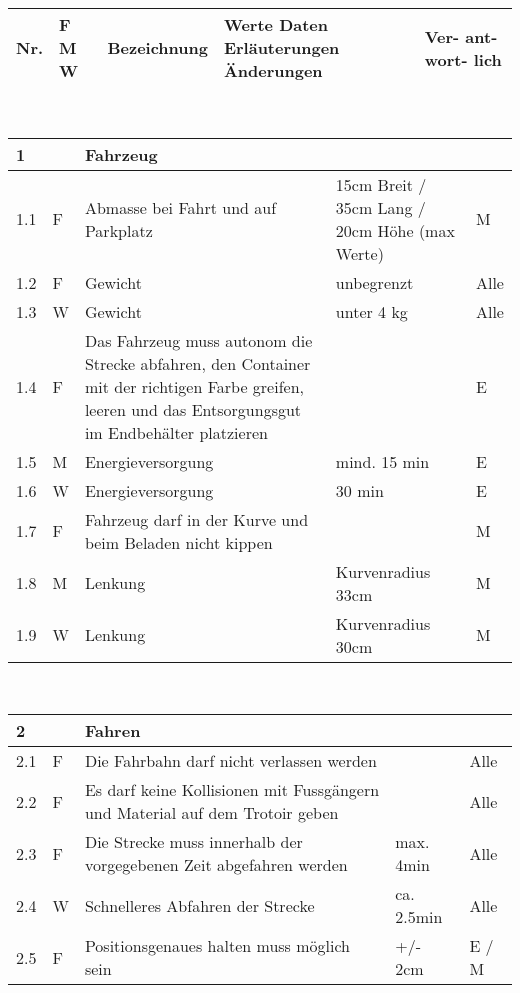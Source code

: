 \begin{center}
\begin{tabular}{|p{1cm}|p{0.5cm}|p{5cm}|p{5cm}|p{1.5cm}|}\hline
\textbf{Nr.} & \textbf{F M W} & \textbf{Bezeichnung} & \textbf{Werte Daten Erläuterungen Änderungen} & \textbf{Ver- ant- wort- lich}\\\hline
\end{tabular}\\[0.3cm]
\begin{tabular}{|p{1cm}|p{0.5cm}|p{5cm}|p{5cm}|p{1.5cm}|}\hline
 \textbf{1} & & \textbf{Fahrzeug} & & \\\hline
 1.1 & F & Abmasse bei Fahrt und auf Parkplatz & 15cm Breit / 35cm Lang / 20cm Höhe (max Werte) & M\\ \hline
 1.2 & F & Gewicht & unbegrenzt & Alle\\\hline
 1.3 & W & Gewicht & unter 4 kg & Alle\\\hline
 1.4 & F & Das Fahrzeug muss autonom die Strecke abfahren, den Container mit der richtigen Farbe greifen, leeren und das Entsorgungsgut im Endbehälter platzieren   & & E\\\hline
 1.5 & M & Energieversorgung & mind. 15 min & E \\\hline
 1.6 & W & Energieversorgung & 30 min & E \\\hline
 1.7 & F & Fahrzeug darf in der Kurve und beim Beladen nicht kippen & & M \\\hline
 1.8 & M & Lenkung & Kurvenradius 33cm & M \\\hline
 1.9 & W & Lenkung & Kurvenradius 30cm & M \\\hline
\end{tabular}\\[0.3cm]
\begin{tabular}{|p{1cm}|p{0.5cm}|p{5cm}|p{5cm}|p{1.5cm}|}\hline
 \textbf{2} & & \textbf{Fahren} & & \\\hline
 2.1 & F & Die Fahrbahn darf nicht verlassen werden & & Alle\\\hline
 2.2 & F & Es darf keine Kollisionen mit Fussgängern und Material auf dem Trotoir geben & & Alle \\\hline
 2.3 & F & Die Strecke muss innerhalb der vorgegebenen Zeit abgefahren werden & max. 4min & Alle\\\hline
 2.4 & W & Schnelleres Abfahren der Strecke & ca. 2.5min & Alle\\\hline
 2.5 & F & Positionsgenaues halten muss möglich sein & +/- 2cm & E / M\\\hline

\end{tabular}
\end{center}
